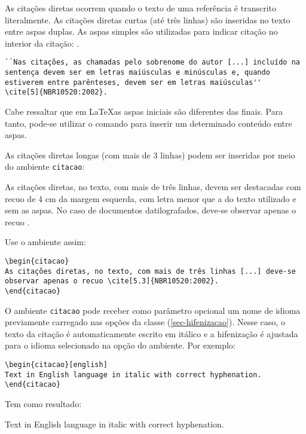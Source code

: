 As citações diretas ocorrem quando o texto de uma referência é transcrito literalmente. As citações diretas curtas (até três linhas) são inseridas no texto entre aspas duplas. As aspas simples são utilizadas para indicar citação no interior da citação:  \cite[sec.~5]{NBR10520:2002}.

\begin{verbatim}
``Nas citações, as chamadas pelo sobrenome do autor [...] incluído na 
sentença devem ser em letras maiúsculas e minúsculas e, quando 
estiverem entre parênteses, devem ser em letras maiúsculas''
\cite[5]{NBR10520:2002}.
\end{verbatim}

Cabe ressaltar que em \LaTeX as aspas iniciais são diferentes das finais. Para tanto, pode-se utilizar o comando  para inserir um determinado conteúdo entre aspas.

As citações diretas longas (com mais de 3 linhas) podem ser inseridas por meio do ambiente \texttt{citacao}:

\begin{citacao}
As citações diretas, no texto, com mais de três linhas, devem ser
destacadas com recuo de 4 cm da margem esquerda, com letra menor que a do texto
utilizado e sem as aspas. No caso de documentos datilografados, deve-se
observar apenas o recuo \cite[5.3]{NBR10520:2002}.
\end{citacao}

Use o ambiente assim:

\begin{verbatim}
\begin{citacao}
As citações diretas, no texto, com mais de três linhas [...] deve-se 
observar apenas o recuo \cite[5.3]{NBR10520:2002}.
\end{citacao}
\end{verbatim}

O ambiente \texttt{citacao} pode receber como parâmetro opcional um nome de
idioma previamente carregado nas opções da classe (\autoref{sec-hifenizacao}). Nesse
caso, o texto da citação é automaticamente escrito em itálico e a hifenização é
ajustada para o idioma selecionado na opção do ambiente. Por exemplo:

\begin{verbatim}
\begin{citacao}[english]
Text in English language in italic with correct hyphenation.
\end{citacao}
\end{verbatim}

Tem como resultado:

\begin{citacao}[english]
Text in English language in italic with correct hyphenation.
\end{citacao}
